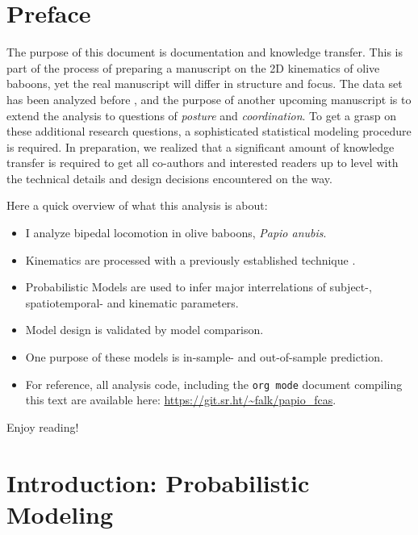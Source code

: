 
\clearpage

\section{Preface}
\label{sec:orgcfa10a1}
The purpose of this document is documentation and knowledge transfer.
This is part of the process of preparing a manuscript on the 2D kinematics of olive baboons, yet the real manuscript will differ in structure and focus.
The data set has been analyzed before \citep[][]{Druelle2021}, and the purpose of another upcoming manuscript is to extend the analysis to questions of \emph{posture} and \emph{coordination}.
To get a grasp on these additional research questions, a sophisticated statistical modeling procedure is required.
In preparation, we realized that a significant amount of knowledge transfer is required to get all co-authors and interested readers up to level with the technical details and design decisions encountered on the way.


Here a quick overview of what this analysis is about:
\begin{itemize}
\item I analyze bipedal locomotion in olive baboons, \emph{Papio anubis}.
\item Kinematics are processed with a previously established technique \citep["Fourier Coefficient Affine Superimposition", cf.][]{Mielke2019}.
\item Probabilistic Models are used to infer major interrelations of subject-, spatiotemporal- and kinematic parameters.
\item Model design is validated by model comparison.
\item One purpose of these models is in-sample- and out-of-sample prediction.
\item For reference, all analysis code, including the \texttt{org mode} document compiling this text are available here: \url{https://git.sr.ht/\~falk/papio\_fcas}.
\end{itemize}



Enjoy reading!


\FloatBarrier
\clearpage
\section{Introduction: Probabilistic Modeling}
\label{sec:org2074548}
